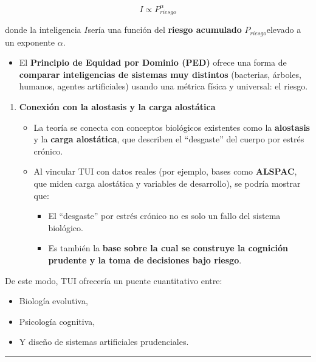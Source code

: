 \[I \propto P_{riesgo}^{\alpha}
\]

donde la inteligencia \(I\)sería una función del \textbf{riesgo
acumulado} \(P_{riesgo}\)elevado a un exponente \(\alpha\).

\begin{itemize}
\item
  El \textbf{Principio de Equidad por Dominio (PED)} ofrece una forma de
  \textbf{comparar inteligencias de sistemas muy distintos} (bacterias,
  árboles, humanos, agentes artificiales) usando una métrica física y
  universal: el riesgo.
\end{itemize}

\begin{enumerate}
\def\labelenumi{\arabic{enumi}.}
\setcounter{enumi}{1}
\item
  \textbf{Conexión con la alostasis y la carga alostática}

  \begin{itemize}
  \item
    La teoría se conecta con conceptos biológicos existentes como la
    \textbf{alostasis} y la \textbf{carga alostática}, que describen el
    ``desgaste'' del cuerpo por estrés crónico.
  \item
    Al vincular TUI con datos reales (por ejemplo, bases como
    \textbf{ALSPAC}, que miden carga alostática y variables de
    desarrollo), se podría mostrar que:

    \begin{itemize}
    \item
      El ``desgaste'' por estrés crónico no es solo un fallo del sistema
      biológico.
    \item
      Es también la \textbf{base sobre la cual se construye la cognición
      prudente y la toma de decisiones bajo riesgo}.
    \end{itemize}
  \end{itemize}
\end{enumerate}

De este modo, TUI ofrecería un puente cuantitativo entre:

\begin{itemize}
\item
  Biología evolutiva,
\item
  Psicología cognitiva,
\item
  Y diseño de sistemas artificiales prudenciales.
\end{itemize}

\begin{center}\rule{0.5\linewidth}{0.5pt}\end{center}

